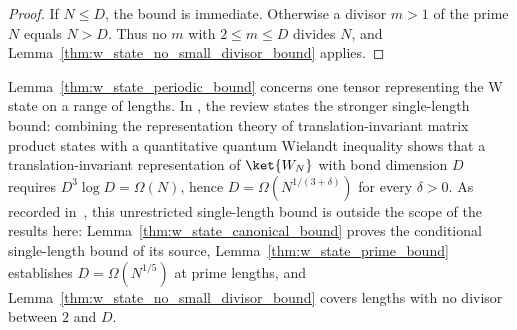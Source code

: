\begin{proof}
    \leanok
    If $N\leq D$, the bound is immediate. Otherwise a divisor $m>1$ of the
    prime $N$ equals $N>D$. Thus no $m$ with $2\leq m\leq D$ divides $N$,
    and Lemma~\ref{thm:w_state_no_small_divisor_bound} applies.
\end{proof}

\begin{remark}%
    \label{rem:w_state_ti_bound}
    Lemma~\ref{thm:w_state_periodic_bound} concerns one tensor representing
    the W state on a range of lengths. In
    \cite[Appendix~A, ``The W state'']{Cirac2021Matrix}, the review states the
    stronger single-length bound: combining the representation theory of
    translation-invariant matrix product states with a quantitative quantum
    Wielandt inequality shows that a translation-invariant representation of
    $\ket{W_N}$ with bond dimension $D$ requires $D^3\log D=\Omega(N)$, hence
    $D=\Omega(N^{1/(3+\delta)})$ for every $\delta>0$. As recorded
    in~\cite{gap:rmp_w_state_ti_bound}, this unrestricted single-length bound
    is outside the scope of the results here:
    Lemma~\ref{thm:w_state_canonical_bound} proves the conditional
    single-length bound of its source, Lemma~\ref{thm:w_state_prime_bound}
    establishes $D=\Omega(N^{1/5})$ at prime lengths, and
    Lemma~\ref{thm:w_state_no_small_divisor_bound} covers lengths with no
    divisor between $2$ and $D$.
\end{remark}



